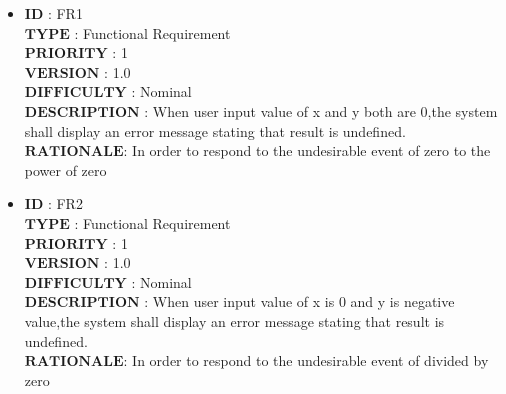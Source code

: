 \documentclass[a4paper, 11pt]{article}
\begin{document}
\begin{itemize}
   \item $\boldsymbol{ID}$\hspace{2.95cm}   : FR1\\
   $\boldsymbol{TYPE}$\hspace{2.2cm}   : Functional Requirement\\
   $\boldsymbol{PRIORITY}$\hspace{1.05cm} : 1\\
   $\boldsymbol{VERSION}$\hspace{1.25cm} : 1.0\\
   $\boldsymbol{DIFFICULTY}$\hspace{0.4cm} : Nominal \\
   $\boldsymbol{DESCRIPTION}$     : When user input value of x and y both are 0,the system shall display an error message stating that result is undefined.\\
   $\boldsymbol{RATIONALE}$\hspace{0.8cm}: In order to respond to the undesirable event of zero to the power of zero\\
   
   \item $\boldsymbol{ID}$\hspace{2.95cm}   : FR2\\
   $\boldsymbol{TYPE}$\hspace{2.2cm}   : Functional Requirement\\
   $\boldsymbol{PRIORITY}$\hspace{1.05cm} : 1\\
   $\boldsymbol{VERSION}$\hspace{1.25cm} : 1.0\\
   $\boldsymbol{DIFFICULTY}$\hspace{0.4cm} : Nominal \\
   $\boldsymbol{DESCRIPTION}$    : When user input value of x is 0 and y is negative value,the system shall display an error message stating that result is undefined. \\
   $\boldsymbol{RATIONALE}$\hspace{0.8cm}: In order to respond to the undesirable event of divided by zero\\
   

\end{itemize}
\end{document}
